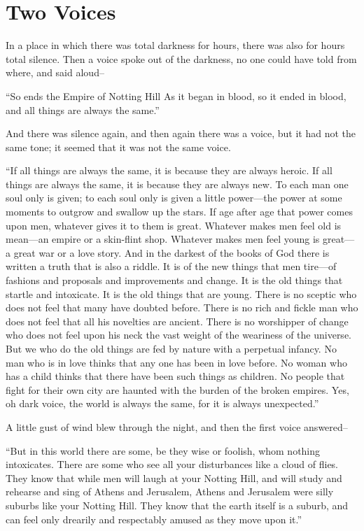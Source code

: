 \documentclass{book}
\begin{document}
\chapter{Two Voices}
\label{chapter-19}
In a place in which there was total darkness for hours, there was also for hours total silence. Then a voice spoke out of the darkness, no one could have told from where, and said aloud–

“So ends the Empire of Notting Hill As it began in blood, so it ended in blood, and all things are always the same.”

And there was silence again, and then again there was a voice, but it had not the same tone; it seemed that it was not the same voice.

“If all things are always the same, it is because they are always heroic. If all things are always the same, it is because they are always new. To each man one soul only is given; to each soul only is given a little power—the power at some moments to outgrow and swallow up the stars. If age after age that power comes upon men, whatever gives it to them is great. Whatever makes men feel old is mean—an empire or a skin-flint shop. Whatever makes men feel young is great—a great war or a love story. And in the darkest of the books of God there is written a truth that is also a riddle. It is of the new things that men tire—of fashions and proposals and improvements and change. It is the old things that startle and intoxicate. It is the old things that are young. There is no sceptic who does not feel that many have doubted before. There is no rich and fickle man who does not feel that all his novelties are ancient. There is no worshipper of change who does not feel upon his neck the vast weight of the weariness of the universe. But we who do the old things are fed by nature with a perpetual infancy. No man who is in love thinks that any one has been in love before. No woman who has a child thinks that there have been such things as children. No people that fight for their own city are haunted with the burden of the broken empires. Yes, oh dark voice, the world is always the same, for it is always unexpected.”

A little gust of wind blew through the night, and then the first voice answered–

“But in this world there are some, be they wise or foolish, whom nothing intoxicates. There are some who see all your disturbances like a cloud of flies. They know that while men will laugh at your Notting Hill, and will study and rehearse and sing of Athens and Jerusalem, Athens and Jerusalem were silly suburbs like your Notting Hill. They know that the earth itself is a suburb, and can feel only drearily and respectably amused as they move upon it.”
\end{document}
